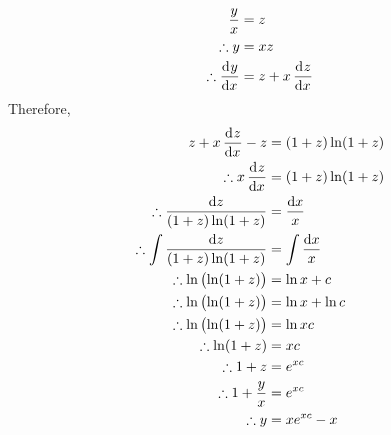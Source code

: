 \documentclass[fleqn, a4paper, 12pt, oneside]{amsart}
\theoremstyle{definition}
\theoremstyle{theorem}
\begin{document}
\begin{solution}
\begin{tasks}
\begin{align*}
				\dfrac{y}{x} &= z\\
				\therefore y &= x z\\
				\therefore \dod{y}{x} &= z + x \dod{z}{x}
			\end{align*}
			Therefore,
			\begin{align*}
				z + x \dod{z}{x} - z &= (1 + z) \ln (1 + z)\\
				\therefore x \dod{z}{x} &= (1 + z) \ln (1 + z)\\
				\therefore \dfrac{\dif z}{(1 + z) \ln (1 + z)} &= \dfrac{\dif x}{x}\\
				\therefore \int \dfrac{\dif z}{(1 + z) \ln (1 + z)} &= \int \dfrac{\dif x}{x}\\
				\therefore \ln \left( \ln (1 + z) \right) &= \ln x + c\\
				\therefore \ln \left( \ln (1 + z) \right) &= \ln x + \ln c\\
				\therefore \ln \left( \ln (1 + z) \right) &= \ln x c\\
				\therefore \ln (1 + z) &= x c\\
				\therefore 1 + z &= e^{x c}\\
				\therefore 1 + \dfrac{y}{x} &= e^{x c}\\
				\therefore y &= x e^{x c} - x
			\end{align*}
	\end{tasks}
\end{solution}

\end{document}
